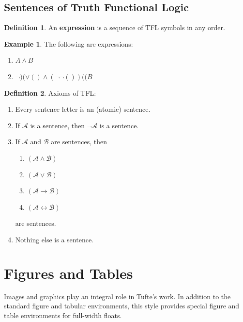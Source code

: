 \documentclass{tufte-handout}
\newcommand{\docenv}[1]{\textsf{#1}}%
\let\biconditional\leftrightarrow
\theoremstyle{definition}
\newtheorem{defn}{Definition}
\theoremstyle{example}
\newtheorem{exmp}{Example}
\theoremstyle{remark}
\begin{document}
\subsection{Sentences of Truth Functional Logic}
\begin{defn}
 An \textbf{expression} is a sequence of TFL symbols in any order.
\end{defn}
\begin{exmp}
  The following are expressions:
  \begin{enumerate}[leftmargin=3\parindent]
    \item $A \land B$
    \item $\neg )(\lor ()\land (\neg \neg ())((B$
    \end{enumerate}
\end{exmp}
\begin{framed}
  \begin{defn}
    Axioms of TFL\@:
    \begin{enumerate}[leftmargin=3\parindent]
      \item Every sentence letter is an (atomic) sentence.
      \item If $\mathcal{A}$ is a sentence, then $\neg \mathcal{A}$ is a sentence.
      \item If $\mathcal{A}$ and $\mathcal{B}$ are sentences, then 
      \begin{enumerate}[leftmargin=3\parindent, label=\roman*.]
        \item $(\mathcal{A} \land \mathcal{B})$ 
        \item $(\mathcal{A} \lor \mathcal{B})$
        \item $(\mathcal{A} \to \mathcal{B})$
        \item $(\mathcal{A} \biconditional \mathcal{B})$
      \end{enumerate}
      are sentences.
      \item Nothing else is a sentence.
    \end{enumerate}
  \end{defn}
\end{framed}

\section{Figures and Tables}\label{sec:figures-and-tables}
Images and graphics play an integral role in Tufte's work. In addition to the
standard \docenv{figure} and \docenv{tabular} environments, this style provides
special figure and table environments for full-width floats.
\end{document}
